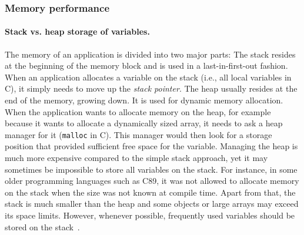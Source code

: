 \subsubsection{Memory performance}
\paragraph{Stack vs. heap storage of variables.} The memory of an application is divided into two major parts: The stack resides at the beginning of the memory block and is used in a last-in-first-out fashion. When an application allocates a variable on the stack (i.e., all local variables in C), it simply needs to move up the \emph{stack pointer}. The heap usually resides at the end of the memory, growing down. It is used for dynamic memory allocation. When the application wants to allocate memory on the heap, for example because it wants to allocate a dynamically sized array, it needs to ask a heap manager for it (\texttt{malloc} in C). This manager would then look for a storage position that provided sufficient free space for the variable. Managing the heap is much more expensive compared to the simple stack approach, yet it may sometimes be impossible to store all variables on the stack. For instance, in some older programming languages such as C89, it was not allowed to allocate memory on the stack when the size was not known at compile time. Apart from that, the stack is much smaller than the heap and some objects or large arrays may exceed its space limits. However, whenever possible, frequently used variables should be stored on the stack~\cite[p. 90]{fog2011optimizing}.
